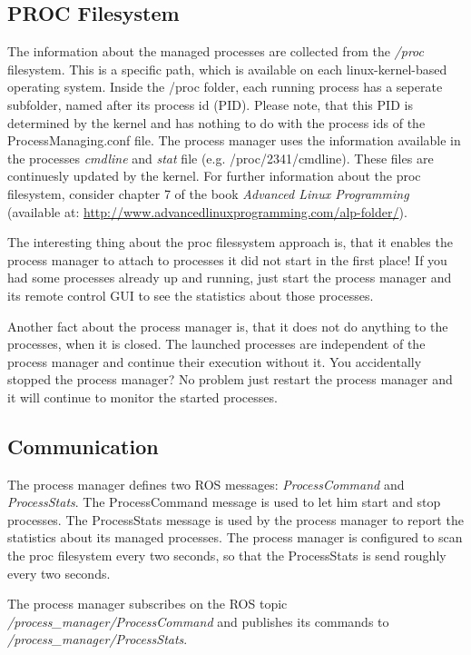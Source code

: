 \subsection*{PROC Filesystem}

The information about the managed processes are collected from the \emph{/proc} filesystem. This is a specific path, which is available on each linux-kernel-based operating system. Inside the /proc folder, each running process has a seperate subfolder, named after its process id (PID). Please note, that this PID is determined by the kernel and has nothing to do with the process ids of the ProcessManaging.conf file. The process manager uses the information available in the processes \emph{cmdline} and \emph{stat} file (e.g. /proc/2341/cmdline). These files are continuesly updated by the kernel. For further information about the proc filesystem, consider chapter 7 of the book \emph{Advanced Linux Programming} (available at: \url{http://www.advancedlinuxprogramming.com/alp-folder/}).

The interesting thing about the proc filessystem approach is, that it enables the process manager to attach to processes it did not start in the first place! If you had some processes already up and running, just start the process manager and its remote control GUI to see the statistics about those processes. 

Another fact about the process manager is, that it does not do anything to the processes, when it is closed. The launched processes are independent of the process manager and continue their execution without it. You accidentally stopped the process manager? No problem just restart the process manager and it will continue to monitor the started processes.

\subsection*{Communication}

The process manager defines two ROS messages: \emph{ProcessCommand} and \emph{ProcessStats}. The ProcessCommand message is used to let him start and stop processes. The ProcessStats message is used by the process manager to report the statistics about its managed processes. The process manager is configured to scan the proc filesystem every two seconds, so that the ProcessStats is send roughly every two seconds.

The process manager subscribes on the ROS topic \emph{/process\_manager/ProcessCommand} and publishes its commands to \emph{/process\_manager/ProcessStats}.

